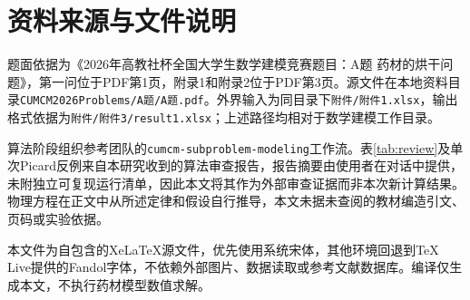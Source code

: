 \documentclass[UTF8,a4paper,zihao=-4,fontset=none]{ctexart}
\numberwithin{equation}{section}
\begin{document}
\section{资料来源与文件说明}
题面依据为《2026年高教社杯全国大学生数学建模竞赛题目：A题 药材的烘干问题》，第一问位于PDF第1页，附录1和附录2位于PDF第3页。源文件在本地资料目录\texttt{CUMCM2026Problems/A题/A题.pdf}。外界输入为同目录下\texttt{附件/附件1.xlsx}，输出格式依据为\texttt{附件/附件3/result1.xlsx}；上述路径均相对于数学建模工作目录。

算法阶段组织参考团队的\texttt{cumcm-subproblem-modeling}工作流。表\ref{tab:review}及单次Picard反例来自本研究收到的算法审查报告，报告摘要由使用者在对话中提供，未附独立可复现运行清单，因此本文将其作为外部审查证据而非本次新计算结果。物理方程在正文中从所述定律和假设自行推导，本文未据未查阅的教材编造引文、页码或实验依据。

本文件为自包含的XeLaTeX源文件，优先使用系统宋体，其他环境回退到TeX Live提供的Fandol字体，不依赖外部图片、数据读取或参考文献数据库。编译仅生成本文，不执行药材模型数值求解。
\end{document}
